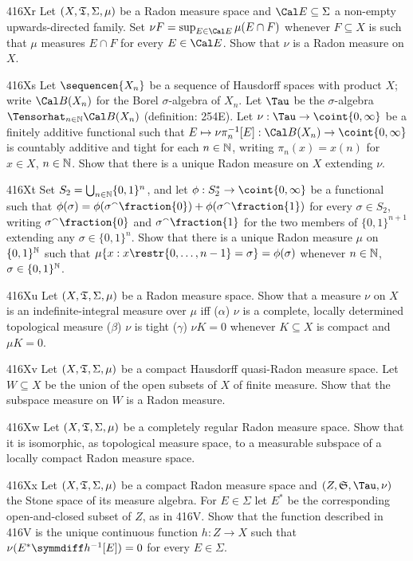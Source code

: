 {\spheader 416Xr Let $(X,\frak T,\Sigma,\mu)$ be a Radon measure space
and $\Cal E\subseteq\Sigma$ a non-empty upwards-directed family.   Set
$\nu F=\sup_{E\in\Cal E}\mu(E\cap F)$ whenever $F\subseteq X$ is such
that $\mu$ measures $E\cap F$ for every $E\in\Cal E$.   Show that $\nu$
is a Radon measure on $X$.

\spheader 416Xs Let $\sequencen{X_n}$ be a sequence of Hausdorff spaces
with product $X$;  write $\Cal B(X_n)$ for the Borel $\sigma$-algebra of
$X_n$.
Let $\Tau$ be the $\sigma$-algebra $\Tensorhat_{n\in\Bbb N}\Cal B(X_n)$
(definition:  254E).   Let $\nu:\Tau\to\coint{0,\infty}$ be a
finitely additive functional such that
$E\mapsto\nu\pi_n^{-1}[E]:\Cal B(X_n)\to\coint{0,\infty}$ is countably
additive and tight for each $n\in\Bbb N$, writing
$\pi_n(x)=x(n)$ for $x\in X$, $n\in\Bbb N$.   Show that there is
a unique Radon measure on $X$ extending $\nu$.

\spheader 416Xt Set $S_2=\bigcup_{n\in\Bbb N}\{0,1\}^n$, and let
$\phi:S_2^*\to\coint{0,\infty}$ be a functional such that
$\phi(\sigma)=\phi(\sigma^{\smallfrown}\fraction{0})
 +\phi(\sigma^{\smallfrown}\fraction{1})$
for every $\sigma\in S_2$, writing $\sigma^{\smallfrown}\fraction{0}$ and
$\sigma^{\smallfrown}\fraction{1}$ for the two members of $\{0,1\}^{n+1}$ extending
any $\sigma\in\{0,1\}^n$.   Show that there is a unique Radon measure
$\mu$ on $\{0,1\}^{\Bbb N}$ such that
$\mu\{x:x\restr\{0,\ldots,n-1\}=\sigma\}
=\phi(\sigma)$ whenever $n\in\Bbb N$, $\sigma\in\{0,1\}^{\Bbb N}$.

\spheader 416Xu Let $(X,\frak T,\Sigma,\mu)$ be a Radon measure space.
Show that a measure $\nu$
on $X$ is an indefinite-integral measure over $\mu$ iff ($\alpha$) $\nu$
is a complete, locally determined topological measure ($\beta$) $\nu$ is
tight ($\gamma$) $\nu K=0$
whenever $K\subseteq X$ is compact and $\mu K=0$.

\spheader 416Xv Let $(X,\frak T,\Sigma,\mu)$ be a compact Hausdorff
quasi-Radon measure space.   Let $W\subseteq X$ be the union of the open
subsets of $X$ of finite measure.   Show that the subspace measure on
$W$ is a Radon measure.

\spheader 416Xw Let $(X,\frak T,\Sigma,\mu)$ be a completely regular
Radon measure space.   Show that it
is isomorphic, as topological measure space,
to a measurable subspace of a locally compact Radon measure space.

\spheader 416Xx Let $(X,\frak T,\Sigma,\mu)$ be a compact Radon measure
space and $(Z,\frak S,\Tau,\nu)$ the Stone space of its measure algebra.
For $E\in\Sigma$ let $E^*$ be the corresponding open-and-closed subset
of $Z$, as in 416V.   Show that the function described in 416V is the
unique continuous function $h:Z\to X$ such that
$\nu(E^*\symmdiff h^{-1}[E])=0$ for every $E\in\Sigma$.

}
